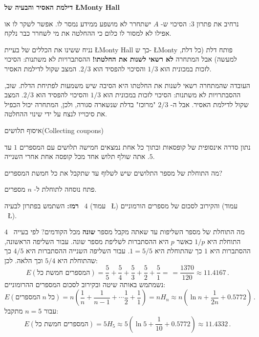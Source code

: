 \textbf{\Large דילמת האסיר והבעיה של
\L{Monty Hall}}

\medskip

נרחיב את פתרון 
$3$:
הסיכוי ש-%
$A$
ישתחרר לא מושפע ממידע נמסר לו. אפשר לשקר לו או אפילו לא למסור לו כלום כי ההחלטה את מי לשחרר כבר נלקח.

נניח ששינו את הכללים של בעיית 
\L{Monty Hall}
כך ש-%
\L{Monty}
פותח דלת (כל דלת, למעשה) אבל המתחרה
\textbf{לא רשאי לשנות את החלטתו!}
ההסתברויות לא משתנות: הסיכוי לזכות במכונית הוא
$1/3$
והסיכוי להפסיד הוא
$2/3$.
המצב שקול לדילמת האסיר.

העובדה שהמתחרה רשאי לשנות את החלטתו היא הסיבה שיש משמעות לפתיחת הדלת. שוב, ההסבתרויות לא משתנות: הסיכוי לזכות במכונית הוא
$1/3$
והסיכוי להפסיד הוא
$2/3$.
המצב שקול לדילמת האסיר. אבל ה-%
$2/3$
"מרוכז" בדלת שנשארה סגורה, ולכן, המתחרה יכול הכפיל את סיכוייו לנצח על ידי שינוי ההחלטה.


\begin{prob}{איסוף תלושים}{}{(Collecting coupons)}

נתון סדרה אינסופית של קופסאות ובתוך כל אחת נמצאים חמישה תלושים עם המספרים 
$1$
עד
$5$.
אתה שולף תלוש אחד מכל קופסה אחת אחרי השנייה.

מה התוחלת של מספר התלושים שיש לשלוף עד שתקבל את כל חמשת המספרים?

פתח נוסחה לתוחלת ל-%
$n$
מספרים.

\textbf{רמז:}
השתמש בפתרון לבעיה%
~$4$
(עמוד%
~\L{\pageref{p.four}})
והקירוב לסכום של מספרים הורמוניים 
(עמוד%
~\L{\pageref{p.harmonic}}).
\end{prob}

\solution{}

מה התוחלת של מספר השליפות עד שאתה מקבל מספר
\textbf{שונה}
מכל הקודמים? לפי בעייה~%
$4$
התוחלת היא
$1/p$
כאשר 
$p$
היא ההסתברות לשליפת מספר שונה. עבור השליפה הראשונה, ההסתברות היא 
$1$
כך שהתוחלת היא
$1=5/5$.
עבור השליפה השנייה ההסתברות היא 
$4/5$
כך שהתוחלת היא 
$5/4$
וכך הלאה. לכן:
\[
E(\textrm{המספרים חמשת כל}) = \frac{5}{5}+\frac{5}{4} + \frac{5}{3} + \frac{5}{2} + \frac{5}{1} = \frac{}{} =\frac{1370}{120}\approx 11.4167\,.
\]
נשמתמש באותה שיטה ובקירוב לסכום המספרים ההרומוניים:
\[
E(\textrm{המספרים}\;n \;\textrm{כל}) = n\left(\frac{1}{n}+\frac{1}{n-1} + \cdots \frac{1}{2} + \frac{1}{1}\right) =nH_n\approx n\left(\ln n + \frac{1}{2n} + 0.5772\right)\,. 
\]
עבור
$n=5$
מתקבל:
\[
E(\textrm{המספרים חמשת כל}) =5H_5\approx 5\left(\ln 5 + \frac{1}{10} + 0.5772\right) \approx 11.4332\,.
\]

